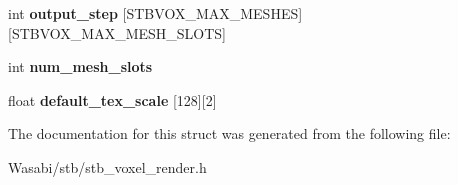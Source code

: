 \begin{DoxyCompactItemize}
\item 
int {\bfseries output\+\_\+step} \mbox{[}S\+T\+B\+V\+O\+X\+\_\+\+M\+A\+X\+\_\+\+M\+E\+S\+H\+ES\mbox{]}\mbox{[}S\+T\+B\+V\+O\+X\+\_\+\+M\+A\+X\+\_\+\+M\+E\+S\+H\+\_\+\+S\+L\+O\+TS\mbox{]}\hypertarget{structstbvox__mesh__maker_a53b08e1b4629045e17ed810bbb711dba}{}\label{structstbvox__mesh__maker_a53b08e1b4629045e17ed810bbb711dba}

\item 
int {\bfseries num\+\_\+mesh\+\_\+slots}\hypertarget{structstbvox__mesh__maker_abecfe9b61d3634613525880dae6437eb}{}\label{structstbvox__mesh__maker_abecfe9b61d3634613525880dae6437eb}

\item 
float {\bfseries default\+\_\+tex\+\_\+scale} \mbox{[}128\mbox{]}\mbox{[}2\mbox{]}\hypertarget{structstbvox__mesh__maker_a7e6ac5c4ff7b7523ce32f84c8cd991e4}{}\label{structstbvox__mesh__maker_a7e6ac5c4ff7b7523ce32f84c8cd991e4}

\end{DoxyCompactItemize}


The documentation for this struct was generated from the following file\+:\begin{DoxyCompactItemize}
\item 
Wasabi/stb/stb\+\_\+voxel\+\_\+render.\+h\end{DoxyCompactItemize}
